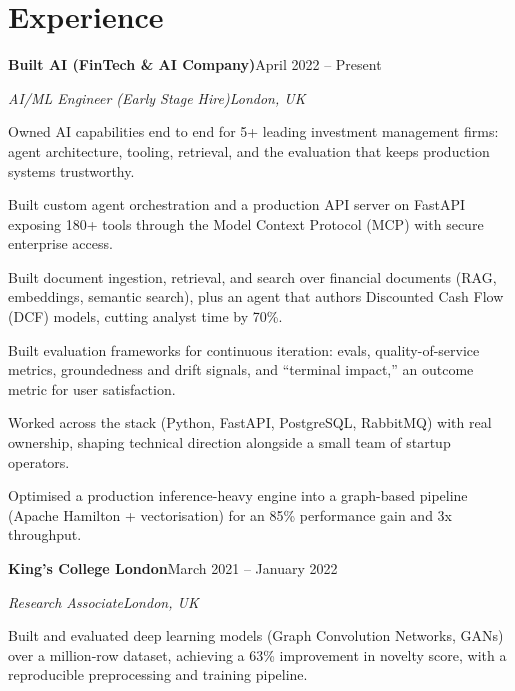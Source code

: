 \documentclass[10pt,a4paper]{article}
\newcommand{\entry}[4]{%
  {\color{company}\bfseries #1}\hfill {\color{muted}#2}\par
  \vspace{1pt}
  {\itshape #3}\hfill {\color{muted}\itshape #4}\par
  \vspace{3pt}%
}
\begin{document}
\section{Experience}
\entry{Built AI (FinTech \& AI Company)}{April 2022 -- Present}{AI/ML Engineer (Early Stage Hire)}{London, UK}
\begin{tight}
  \item Owned AI capabilities end to end for 5+ leading investment management firms: agent architecture, tooling, retrieval, and the evaluation that keeps production systems trustworthy.
  \item Built custom agent orchestration and a production API server on FastAPI exposing 180+ tools through the Model Context Protocol (MCP) with secure enterprise access.
  \item Built document ingestion, retrieval, and search over financial documents (RAG, embeddings, semantic search), plus an agent that authors Discounted Cash Flow (DCF) models, cutting analyst time by 70\%.
  \item Built evaluation frameworks for continuous iteration: evals, quality-of-service metrics, groundedness and drift signals, and ``terminal impact,'' an outcome metric for user satisfaction.
  \item Worked across the stack (Python, FastAPI, PostgreSQL, RabbitMQ) with real ownership, shaping technical direction alongside a small team of startup operators.
  \item Optimised a production inference-heavy engine into a graph-based pipeline (Apache Hamilton + vectorisation) for an 85\% performance gain and 3x throughput.
\end{tight}

\entry{King's College London}{March 2021 -- January 2022}{Research Associate}{London, UK}
\begin{tight}
  \item Built and evaluated deep learning models (Graph Convolution Networks, GANs) over a million-row dataset, achieving a 63\% improvement in novelty score, with a reproducible preprocessing and training pipeline.
\end{tight}

\end{document}
